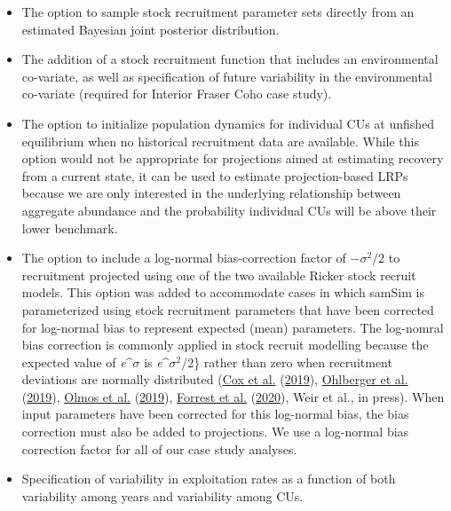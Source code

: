 \documentclass[11pt]{book}
\begin{document}
\begin{itemize}
\item
  The option to sample stock recruitment parameter sets directly from an estimated Bayesian joint posterior distribution.
\item
  The addition of a stock recruitment function that includes an environmental co-variate, as well as specification of future variability in the environmental co-variate (required for Interior Fraser Coho case study).
\item
  The option to initialize population dynamics for individual CUs at unfished equilibrium when no historical recruitment data are available. While this option would not be appropriate for projections aimed at estimating recovery from a current state, it can be used to estimate projection-based LRPs because we are only interested in the underlying relationship between aggregate abundance and the probability individual CUs will be above their lower benchmark.
\item
  The option to include a log-normal bias-correction factor of \(-\sigma^2 / 2\) to recruitment projected using one of the two available Ricker stock recruit models. This option was added to accommodate cases in which samSim is parameterized using stock recruitment parameters that have been corrected for log-normal bias to represent expected (mean) parameters. The log-nomral bias correction is commonly applied in stock recruit modelling because the expected value of \emph{e}\^{}\(\sigma\) is \emph{e}\^{}\(\sigma^2 / 2\)\} rather than zero when recruitment deviations are normally distributed (\protect\hyperlink{ref-coxCandidateLimitReference2019}{Cox et al.} (\protect\hyperlink{ref-coxCandidateLimitReference2019}{2019}), \protect\hyperlink{ref-ohlbergerBayesianLifecycleModel2019}{Ohlberger et al.} (\protect\hyperlink{ref-ohlbergerBayesianLifecycleModel2019}{2019}), \protect\hyperlink{ref-olmosEvidenceSpatialCoherence2019}{Olmos et al.} (\protect\hyperlink{ref-olmosEvidenceSpatialCoherence2019}{2019}), \protect\hyperlink{ref-forrestAssessmentPacificCod2020}{Forrest et al.} (\protect\hyperlink{ref-forrestAssessmentPacificCod2020}{2020}), Weir et al., in press). When input parameters have been corrected for this log-normal bias, the bias correction must also be added to projections. We use a log-normal bias correction factor for all of our case study analyses.
\item
  Specification of variability in exploitation rates as a function of both variability among years and variability among CUs.
\end{itemize}
\end{document}
